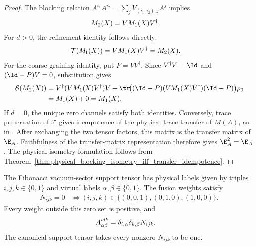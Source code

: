 \begin{proof}
    \leanok
    The blocking relation
    $A^{i_1}A^{i_2}=\sum_jV_{(i_1,i_2),j}A^j$ implies
    \begin{align}
        M_2(X) & =V M_1(X)V^\dagger.
        \notag
    \end{align}
    For $d>0$, the refinement identity follows directly:
    \begin{align}
        \mathcal T(M_1(X))
         & =V M_1(X)V^\dagger
        =M_2(X).
        \notag
    \end{align}
    For the coarse-graining identity, put $P=VV^\dagger$. Since
    $V^\dagger V=\Id$ and $(\Id-P)V=0$, substitution gives
    \begin{align}
        \mathcal S(M_2(X))
         & =V^\dagger(VM_1(X)V^\dagger)V
        +\tr\!\bigl((\Id-P)(VM_1(X)V^\dagger)(\Id-P)\bigr)\rho_0
        \notag                           \\
         & =M_1(X)+0
        =M_1(X).
        \notag
    \end{align}
    If $d=0$, the unique zero channels satisfy both identities. Conversely,
    trace preservation of $\mathcal T$ gives idempotence of the physical-trace
    transfer of $M(A)$, as in
    \cite[Appendix C, lines~1333--1340]{Cirac2016MPDO_arXiv}. After exchanging
    the two tensor factors, this matrix is the transfer matrix of $\E_A$.
    Faithfulness of the transfer-matrix representation therefore gives
    $\E_A^2=\E_A$. The physical-isometry formulation follows from
    Theorem~\ref{thm:physical_blocking_isometry_iff_transfer_idempotence}.
\end{proof}
\begin{definition}
    \label{def:cpsv_fibonacci_support_tensor}
    \leanok
    The Fibonacci vacuum-sector support tensor
    \cite[Appendix~D, lines~2116--2121]{Cirac2016MPDO_arXiv} has physical labels
    given by triples $i,j,k\in\{0,1\}$ and virtual labels
    $\alpha,\beta\in\{0,1\}$.  The fusion weights satisfy
    \begin{align}
        N_{ijk}=0
         & \iff (i,j,k)\in\{(0,0,1),(0,1,0),(1,0,0)\}.
        \label{eq:cpsv_fib_support}
    \end{align}
    Every weight outside this zero set is positive, and
    \begin{align}
        A^{ijk}_{\alpha\beta}
         & =\delta_{i,\alpha}\delta_{k,\beta}N_{ijk}.
        \notag
    \end{align}
    The canonical support tensor takes every nonzero $N_{ijk}$ to be one.
\end{definition}

